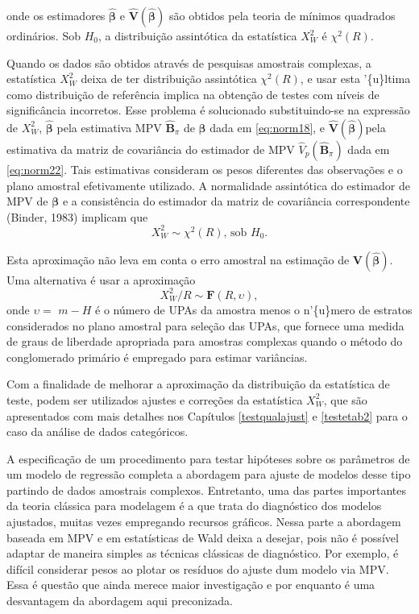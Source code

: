 \documentclass[]{book}
\numberwithin{example}{chapter}
\numberwithin{remark}{chapter}
\numberwithin{definition}{chapter}
\begin{document}
onde os estimadores \(\widehat{\mathbf{\beta }}\) e
\(\widehat{\mathbf{V}}\left( \mathbf{\hat{\beta}}\right)\) são obtidos
pela teoria de mínimos quadrados ordinários. Sob \(H_{0}\), a
distribuição assintótica da estatística \(X_{W}^{2}\) é
\(\chi ^{2}\left(R\right)\).

Quando os dados são obtidos através de pesquisas amostrais complexas, a
estatística \(X_{W}^{2}\) deixa de ter distribuição assintótica
\(\chi ^{2}\left( R\right)\), e usar esta '\{u\}ltima como distribuição
de referência implica na obtenção de testes com níveis de significância
incorretos. Esse problema é solucionado substituindo-se na expressão de
\(X_{W}^{2}\), \(\mathbf{\hat{\beta}}\) pela estimativa MPV
\(\widehat{\mathbf{B}}_{\pi }\) de \(\mathbf{\beta}\) dada em
\eqref{eq:norm18}, e
\(\widehat{\mathbf{V}}\left( \mathbf{\hat{\beta}}\right)\)pela
estimativa da matriz de covariância do estimador de MPV
\(\hat{V}_{p}\left( \widehat{\mathbf{B}}_{\pi }\right)\) dada em
\eqref{eq:norm22}. Tais estimativas consideram os pesos diferentes das
observações e o plano amostral efetivamente utilizado. A normalidade
assintótica do estimador de MPV de \(\mathbf{\beta}\) e a consistência
do estimador da matriz de covariância correspondente (Binder, 1983)
implicam que \[
X_{W}^{2}\sim \chi^{2}\left( R\right)\mbox{, sob }H_{0}.
\]

Esta aproximação não leva em conta o erro amostral na estimação de
\(\mathbf{V}\left( \mathbf{\hat{\beta}}\right) .\) Uma alternativa é
usar a aproximação \[
X_{W}^{2}/R\sim \mathbf{F}(R,\upsilon),
\] onde \(\upsilon =\) \(m-H\) é o número de UPAs da amostra menos o
n'\{u\}mero de estratos considerados no plano amostral para seleção das
UPAs, que fornece uma medida de graus de liberdade apropriada para
amostras complexas quando o método do conglomerado primário é empregado
para estimar variâncias.

Com a finalidade de melhorar a aproximação da distribuição da
estatística de teste, podem ser utilizados ajustes e correções da
estatística \(X_{W}^{2}\), que são apresentados com mais detalhes nos
Capítulos \ref{testqualajust} e \ref{testetab2} para o caso da análise
de dados categóricos.

A especificação de um procedimento para testar hipóteses sobre os
parâmetros de um modelo de regressão completa a abordagem para ajuste de
modelos desse tipo partindo de dados amostrais complexos. Entretanto,
uma das partes importantes da teoria clássica para modelagem é a que
trata do diagnóstico dos modelos ajustados, muitas vezes empregando
recursos gráficos. Nessa parte a abordagem baseada em MPV e em
estatísticas de Wald deixa a desejar, pois não é possível adaptar de
maneira simples as técnicas clássicas de diagnóstico. Por exemplo, é
difícil considerar pesos ao plotar os resíduos do ajuste dum modelo via
MPV. Essa é questão que ainda merece maior investigação e por enquanto é
uma desvantagem da abordagem aqui preconizada.
\end{document}
